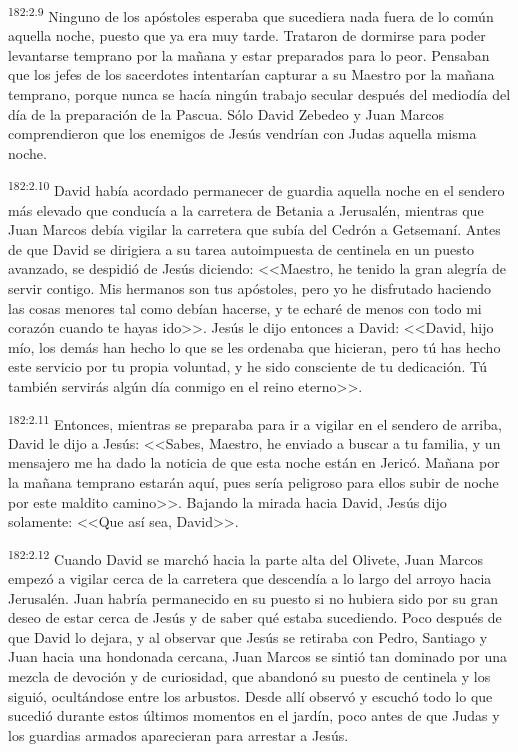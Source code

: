 \par 
\textsuperscript{182:2.9} Ninguno de los apóstoles esperaba que sucediera nada fuera de lo común aquella noche, puesto que ya era muy tarde. Trataron de dormirse para poder levantarse temprano por la mañana y estar preparados para lo peor. Pensaban que los jefes de los sacerdotes intentarían capturar a su Maestro por la mañana temprano, porque nunca se hacía ningún trabajo secular después del mediodía del día de la preparación de la Pascua. Sólo David Zebedeo y Juan Marcos comprendieron que los enemigos de Jesús vendrían con Judas aquella misma noche.

\par 
\textsuperscript{182:2.10} David había acordado permanecer de guardia aquella noche en el sendero más elevado que conducía a la carretera de Betania a Jerusalén, mientras que Juan Marcos debía vigilar la carretera que subía del Cedrón a Getsemaní. Antes de que David se dirigiera a su tarea autoimpuesta de centinela en un puesto avanzado, se despidió de Jesús diciendo: <<Maestro, he tenido la gran alegría de servir contigo. Mis hermanos son tus apóstoles, pero yo he disfrutado haciendo las cosas menores tal como debían hacerse, y te echaré de menos con todo mi corazón cuando te hayas ido>>. Jesús le dijo entonces a David: <<David, hijo mío, los demás han hecho lo que se les ordenaba que hicieran, pero tú has hecho este servicio por tu propia voluntad, y he sido consciente de tu dedicación. Tú también servirás algún día conmigo en el reino eterno>>.

\par 
\textsuperscript{182:2.11} Entonces, mientras se preparaba para ir a vigilar en el sendero de arriba, David le dijo a Jesús: <<Sabes, Maestro, he enviado a buscar a tu familia, y un mensajero me ha dado la noticia de que esta noche están en Jericó. Mañana por la mañana temprano estarán aquí, pues sería peligroso para ellos subir de noche por este maldito camino>>. Bajando la mirada hacia David, Jesús dijo solamente: <<Que así sea, David>>.

\par 
\textsuperscript{182:2.12} Cuando David se marchó hacia la parte alta del Olivete, Juan Marcos empezó a vigilar cerca de la carretera que descendía a lo largo del arroyo hacia Jerusalén. Juan habría permanecido en su puesto si no hubiera sido por su gran deseo de estar cerca de Jesús y de saber qué estaba sucediendo. Poco después de que David lo dejara, y al observar que Jesús se retiraba con Pedro, Santiago y Juan hacia una hondonada cercana, Juan Marcos se sintió tan dominado por una mezcla de devoción y de curiosidad, que abandonó su puesto de centinela y los siguió, ocultándose entre los arbustos. Desde allí observó y escuchó todo lo que sucedió durante estos últimos momentos en el jardín, poco antes de que Judas y los guardias armados aparecieran para arrestar a Jesús.

